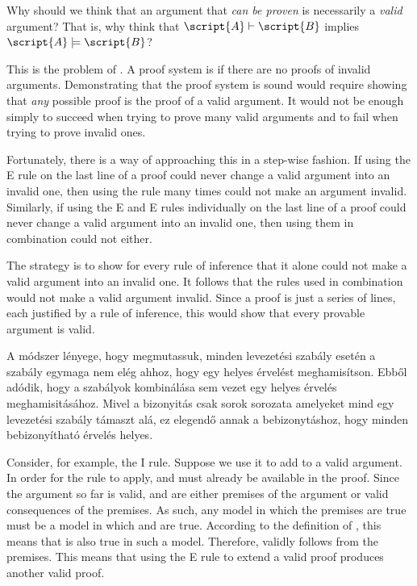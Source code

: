 Why should we think that an argument that \emph{can be proven} is necessarily a \emph{valid} argument? That is, why think that $\script{A}\vdash\script{B}$ implies $\script{A}\models\script{B}$?

This is the problem of . A proof system is  if there are no proofs of invalid arguments. Demonstrating that the proof system is sound would require showing that \emph{any} possible proof is the proof of a valid argument. It would not be enough simply to succeed when trying to prove many valid arguments and to fail when trying to prove invalid ones.

Fortunately, there is a way of approaching this in a step-wise fashion. If using the {\eand}E rule on the last line of a proof could never change a valid argument into an invalid one, then using the rule many times could not make an argument invalid. Similarly, if using the {\eand}E and {\eor}E rules individually on the last line of a proof could never change a valid argument into an invalid one, then using them in combination could not either.


The strategy is to show for every rule of inference that it alone could not make a valid argument into an invalid one. It follows that the rules used in combination would not make a valid argument invalid. Since a proof is just a series of lines, each justified by a rule of inference, this would show that every provable argument is valid.

A módszer lényege, hogy megmutassuk, minden levezetési szabály esetén a szabály egymaga nem elég ahhoz, hogy egy helyes érvelést meghamisítson. Ebből adódik, hogy a szabályok kombinálása sem vezet egy helyes érvelés meghamisitásához. Mivel a bizonyitás csak sorok sorozata amelyeket mind egy levezetési szabály támaszt alá, ez elegendő annak a bebizonytáshoz, hogy minden bebizonyítható érvelés helyes.

Consider, for example, the {\eand}I rule. Suppose we use it to add \eand{} to a valid argument. In order for the rule to apply,  and  must already be available in the proof. Since the argument so far is valid,  and  are either premises of the argument or valid consequences of the premises. As such, any model in which the premises are true must be a model in which  and  are true. According to the definition of , this means that \eand{} is also true in such a model. Therefore, \eand{} validly follows from the premises. This means that using the {\eand}E rule to extend a valid proof produces another valid proof.

